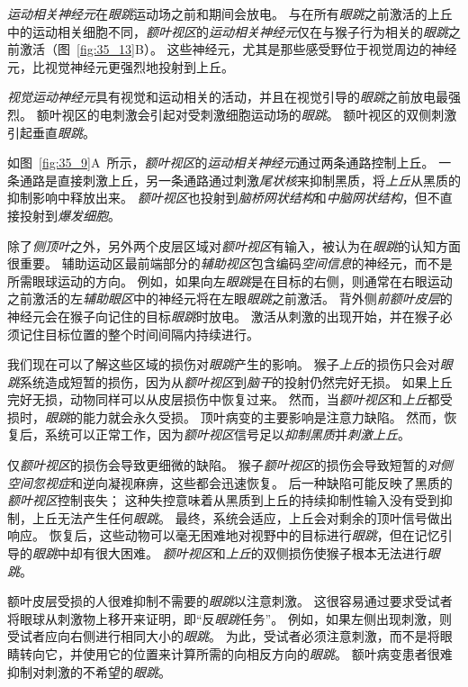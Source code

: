 \textit{运动相关神经元}在\textit{眼跳}运动场之前和期间会放电。
与在所有\textit{眼跳}之前激活的上丘中的运动相关细胞不同，\textit{额叶视区}的\textit{运动相关神经元}仅在与猴子行为相关的\textit{眼跳}之前激活（图~\ref{fig:35_13}B）。
这些神经元，尤其是那些感受野位于视觉周边的神经元，比视觉神经元更强烈地投射到上丘。


\textit{视觉运动神经元}具有视觉和运动相关的活动，并且在视觉引导的\textit{眼跳}之前放电最强烈。
额叶视区的电刺激会引起对受刺激细胞运动场的\textit{眼跳}。
额叶视区的双侧刺激引起垂直\textit{眼跳}。


如图~\ref{fig:35_9}A~所示，\textit{额叶视区}的\textit{运动相关神经元}通过两条通路控制上丘。
一条通路是直接刺激上丘，另一条通路通过刺激\textit{尾状核}来抑制黑质，将\textit{上丘}从黑质的抑制影响中释放出来。
\textit{额叶视区}也投射到\textit{脑桥网状结构}和\textit{中脑网状结构}，但不直接投射到\textit{爆发细胞}。


除了\textit{侧顶叶}之外，另外两个皮层区域对\textit{额叶视区}有输入，被认为在\textit{眼跳}的认知方面很重要。
辅助运动区最前端部分的\textit{辅助视区}包含编码\textit{空间信息}的神经元，而不是所需眼球运动的方向。
例如，如果向左\textit{眼跳}是在目标的右侧，则通常在右眼运动之前激活的左\textit{辅助眼区}中的神经元将在左眼\textit{眼跳}之前激活。
背外侧\textit{前额叶皮层}的神经元会在猴子向记住的目标\textit{眼跳}时放电。
激活从刺激的出现开始，并在猴子必须记住目标位置的整个时间间隔内持续进行。


我们现在可以了解这些区域的损伤对\textit{眼跳}产生的影响。
猴子\textit{上丘}的损伤只会对\textit{眼跳}系统造成短暂的损伤，因为从\textit{额叶视区}到\textit{脑干}的投射仍然完好无损。
如果上丘完好无损，动物同样可以从皮层损伤中恢复过来。
然而，当\textit{额叶视区}和\textit{上丘}都受损时，\textit{眼跳}的能力就会永久受损。
顶叶病变的主要影响是注意力缺陷。
然而，恢复后，系统可以正常工作，因为\textit{额叶视区}信号足以\textit{抑制黑质}并\textit{刺激上丘}。


仅\textit{额叶视区}的损伤会导致更细微的缺陷。
猴子\textit{额叶视区}的损伤会导致短暂的\textit{对侧空间忽视症}和逆向凝视麻痹，这些都会迅速恢复。
后一种缺陷可能反映了黑质的\textit{额叶视区}控制丧失；
这种失控意味着从黑质到上丘的持续抑制性输入没有受到抑制，上丘无法产生任何\textit{眼跳}。
最终，系统会适应，上丘会对剩余的顶叶信号做出响应。
恢复后，这些动物可以毫无困难地对视野中的目标进行\textit{眼跳}，但在记忆引导的\textit{眼跳}中却有很大困难。
\textit{额叶视区}和\textit{上丘}的双侧损伤使猴子根本无法进行\textit{眼跳}。


额叶皮层受损的人很难抑制不需要的\textit{眼跳}以注意刺激。
这很容易通过要求受试者将眼球从刺激物上移开来证明，即“反\textit{眼跳}任务”。
例如，如果左侧出现刺激，则受试者应向右侧进行相同大小的\textit{眼跳}。
为此，受试者必须注意刺激，而不是将眼睛转向它，并使用它的位置来计算所需的向相反方向的\textit{眼跳}。
额叶病变患者很难抑制对刺激的不希望的\textit{眼跳}。


